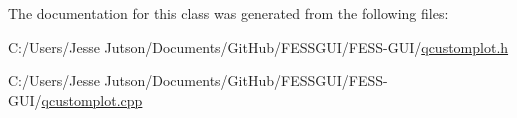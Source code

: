 The documentation for this class was generated from the following files\+:\begin{DoxyCompactItemize}
\item 
C\+:/\+Users/\+Jesse Jutson/\+Documents/\+Git\+Hub/\+F\+E\+S\+S\+G\+U\+I/\+F\+E\+S\+S-\/\+G\+U\+I/\hyperlink{qcustomplot_8h}{qcustomplot.\+h}\item 
C\+:/\+Users/\+Jesse Jutson/\+Documents/\+Git\+Hub/\+F\+E\+S\+S\+G\+U\+I/\+F\+E\+S\+S-\/\+G\+U\+I/\hyperlink{qcustomplot_8cpp}{qcustomplot.\+cpp}\end{DoxyCompactItemize}
